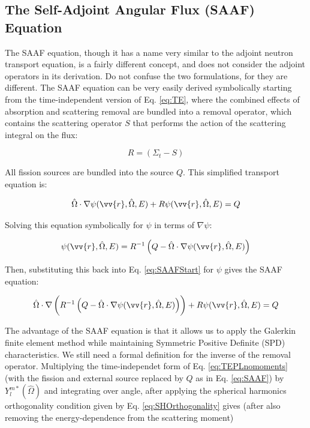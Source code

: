 \documentclass[10pt]{article}
\newcommand{\hO}{\hat{\Omega}}
\begin{document}
\begin{flushleft}
\clearpage
\section{The Self-Adjoint Angular Flux (SAAF) Equation}

The SAAF equation, though it has a name very similar to the adjoint neutron transport equation, is a fairly different concept, and does not consider the adjoint operators in its derivation. Do not confuse the two formulations, for they are different. The SAAF equation can be very easily derived symbolically starting from the time-independent version of Eq. \ref{eq:TE}, where the combined effects of absorption and scattering removal are bundled into a removal operator, which contains the scattering operator \(S\) that performs the action of the scattering integral on the flux:

\begin{equation}
\label{eq:SAAFRemovalOperator}
R = (\Sigma_t - S)
\end{equation}

All fission sources are bundled into the source \(Q\). This simplified transport equation is:

\begin{equation}
\label{eq:SAAFStart}
\hO  \cdot\nabla\psi(\vv{r}, \hO  , E) + R\psi(\vv{r}, \hO  , E) = Q
\end{equation}

Solving this equation symbolically for \(\psi\) in terms of \(\nabla\psi\):

\begin{equation}
\label{eq:SAAFStep1}
\psi(\vv{r}, \hO  , E) = R^{-1}\left(Q-\hO  \cdot\nabla\psi(\vv{r}, \hO  , E)\right)
\end{equation}

Then, substituting this back into Eq. \ref{eq:SAAFStart} for \(\psi\) gives the SAAF equation:

\begin{equation}
\label{eq:SAAF}
\hO   \cdot \nabla \left( R^{-1}\left(Q-\hO  \cdot\nabla\psi(\vv{r}, \hO  , E)\right)\right) + R\psi(\vv{r}, \hO  , E) = Q
\end{equation}

The advantage of the SAAF equation is that it allows us to apply the Galerkin finite element method while maintaining Symmetric Positive Definite (SPD) characteristics. We still need a formal definition for the inverse of the removal operator. Multiplying the time-independet form of Eq. \ref{eq:TEPLnomoments} (with the fission and external source replaced by \(Q\) as in Eq. \ref{eq:SAAF}) by \(Y_l^{m*}(\hO  )\) and integrating over angle, after applying the spherical harmonics orthogonality condition given by Eq. \ref{eq:SHOrthogonality} gives (after also removing the energy-dependence from the scattering moment)


\end{flushleft}
\end{document}
